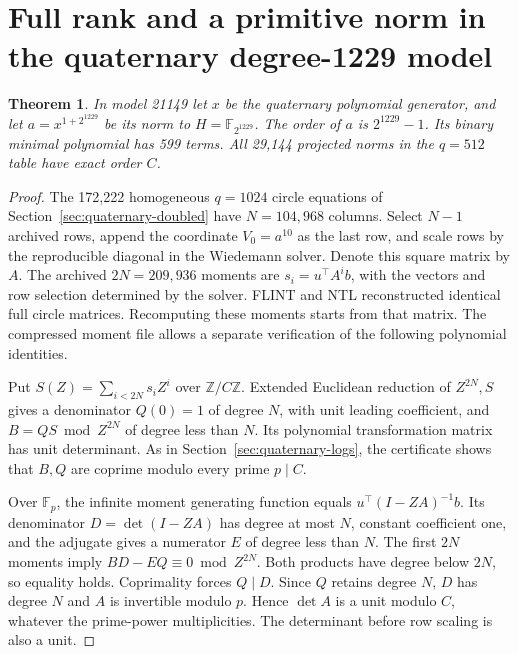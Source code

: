 \documentclass[11pt]{article}
\newtheorem{theorem}{Theorem}
\begin{document}
\section{Full rank and a primitive norm in the quaternary degree-1229 model}
\label{sec:quaternary-rank}

\begin{theorem}
In model 21149 let \(x\) be the quaternary polynomial generator, and
let \(a=x^{1+2^{1229}}\) be its norm to \(H=\mathbb F_{2^{1229}}\).
The order of \(a\) is \(2^{1229}-1\). Its binary minimal polynomial
has 599 terms. All 29,144 projected norms in the \(q=512\) table
have exact order \(C\).
\end{theorem}
\begin{proof}
The 172,222 homogeneous \(q=1024\) circle equations of
Section~\ref{sec:quaternary-doubled} have \(N=104{,}968\) columns.
Select \(N-1\) archived rows, append the coordinate \(V_0=a^{10}\)
as the last row, and scale rows by the reproducible diagonal in the
Wiedemann solver. Denote this square matrix by \(A\). The archived
\(2N=209{,}936\) moments are \(s_i=u^\top A^i b\), with the vectors
and row selection determined by the solver. FLINT and NTL reconstructed
identical full circle matrices. Recomputing these moments starts
from that matrix. The compressed moment file allows a separate
verification of the following polynomial identities.

Put \(S(Z)=\sum_{i<2N}s_i Z^i\) over \(\mathbb Z/C\mathbb Z\).
Extended Euclidean reduction of \(Z^{2N},S\) gives a denominator
\(Q(0)=1\) of degree \(N\), with unit leading coefficient, and
\(B=QS\bmod Z^{2N}\) of degree less than \(N\). Its polynomial
transformation matrix has unit determinant. As in
Section~\ref{sec:quaternary-logs}, the certificate shows that \(B,Q\)
are coprime modulo every prime \(p\mid C\).

Over \(\mathbb F_p\), the infinite moment generating function equals
\(u^\top(I-ZA)^{-1}b\). Its denominator \(D=\det(I-ZA)\) has degree
at most \(N\), constant coefficient one, and the adjugate gives a
numerator \(E\) of degree less than \(N\). The first \(2N\) moments
imply \(BD-EQ\equiv0\bmod Z^{2N}\). Both products have degree below
\(2N\), so equality holds. Coprimality forces \(Q\mid D\). Since \(Q\)
retains degree \(N\), \(D\) has degree \(N\) and \(A\) is invertible
modulo \(p\). Hence \(\det A\) is a unit modulo \(C\), whatever the
prime-power multiplicities. The determinant before row scaling is
also a unit.


\end{proof}
\end{document}
